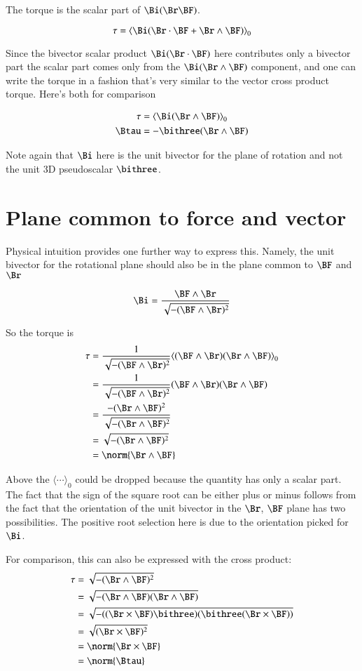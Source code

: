 The torque is the scalar part of $\Bi (\Br \BF)$.

\[
\tau 
   =  {\langle \Bi (\Br \cdot \BF + \Br \wedge \BF) \rangle}_0 \\
\]

Since the bivector scalar product $\Bi (\Br \cdot \BF)$ here contributes only a bivector part the scalar part comes only from the $\Bi (\Br \wedge \BF)$ component,
and one can write the torque in a fashion that's very similar to the vector cross product torque.  Here's both for comparison

\begin{align*}
\tau &=  {\langle \Bi (\Br \wedge \BF) \rangle}_0 \\
\Btau &= -\bithree (\Br \wedge \BF)
\end{align*}

Note again that $\Bi$ here is the unit bivector for the plane of rotation and not the unit 3D pseudoscalar $\bithree$.

\section{Plane common to force and vector}
Physical intuition provides one further way to express this.  Namely, the unit bivector for the rotational plane should also be in the plane common to $\BF$ and $\Br$

\[
\Bi = \frac{\BF \wedge \Br}{\sqrt{-(\BF \wedge \Br)^2}}
\]

So the torque is
\begin{align*}
\tau 
   &=  \frac{1}{\sqrt{-(\BF \wedge \Br)^2}} {\langle (\BF \wedge \Br)(\Br \wedge \BF) \rangle}_0 \\
   &=  \frac{1}{\sqrt{-(\BF \wedge \Br)^2}} {(\BF \wedge \Br)(\Br \wedge \BF) } \\
   &=  \frac {-(\Br \wedge \BF)^2 } {\sqrt{-(\Br \wedge \BF)^2}} \\
   &=  \sqrt {-(\Br \wedge \BF)^2 } \\
   &=  \norm {\Br \wedge \BF}
\end{align*}

Above the ${\langle \cdots \rangle}_0$ could be dropped because the quantity has only a scalar part.
The fact that the sign of the square root can be either plus or minus follows from the fact that the orientation of the unit bivector in the $\Br$, $\BF$ plane has two possibilities.  The positive root selection here is due to the orientation picked for $\Bi$.  

For comparison, this can also be expressed with the cross product:
\begin{align*}
\tau 
   &=  \sqrt {-(\Br \wedge \BF)^2 } \\
   &=  \sqrt {-(\Br \wedge \BF)(\Br \wedge \BF) } \\
   &=  \sqrt {-((\Br \times \BF)\bithree)(\bithree(\Br \times \BF)) } \\
   &=  \sqrt {(\Br \times \BF)^2} \\
   &=  \norm{\Br \times \BF} \\
   &=  \norm{\Btau} \\
\end{align*}

